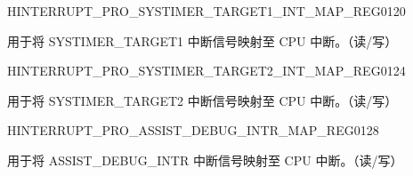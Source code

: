 \begin{register}{H}{INTERRUPT\_PRO\_SYSTIMER\_TARGET1\_INT\_MAP\_REG}{\hexprefix{}0120}\label{regdesc:INTERRUPTPROSYSTIMERTARGET1INTMAPREG}
%
%
\regnewline%
\begin{regdesc}\begin{reglist}
\label{fielddesc:INTERRUPTPROSYSTIMERTARGET1INTMAP}\item [INTERRUPT\_PRO\_SYSTIMER\_TARGET1\_INT\_MAP] 用于将 SYSTIMER\_TARGET1 中断信号映射至 CPU 中断。（读/写）
\end{reglist}\end{regdesc}
\end{register}


\begin{register}{H}{INTERRUPT\_PRO\_SYSTIMER\_TARGET2\_INT\_MAP\_REG}{\hexprefix{}0124}\label{regdesc:INTERRUPTPROSYSTIMERTARGET2INTMAPREG}
%
%
\regnewline%
\begin{regdesc}\begin{reglist}
\label{fielddesc:INTERRUPTPROSYSTIMERTARGET2INTMAP}\item [INTERRUPT\_PRO\_SYSTIMER\_TARGET2\_INT\_MAP] 用于将 SYSTIMER\_TARGET2 中断信号映射至 CPU 中断。（读/写）
\end{reglist}\end{regdesc}
\end{register}


\begin{register}{H}{INTERRUPT\_PRO\_ASSIST\_DEBUG\_INTR\_MAP\_REG}{\hexprefix{}0128}\label{regdesc:INTERRUPTPROASSISTDEBUGINTRMAPREG}
%
%
\regnewline%
\begin{regdesc}\begin{reglist}
\label{fielddesc:INTERRUPTPROASSISTDEBUGINTRMAP}\item [INTERRUPT\_PRO\_ASSIST\_DEBUG\_INTR\_MAP] 用于将 ASSIST\_DEBUG\_INTR 中断信号映射至 CPU 中断。（读/写）
\end{reglist}\end{regdesc}
\end{register}



